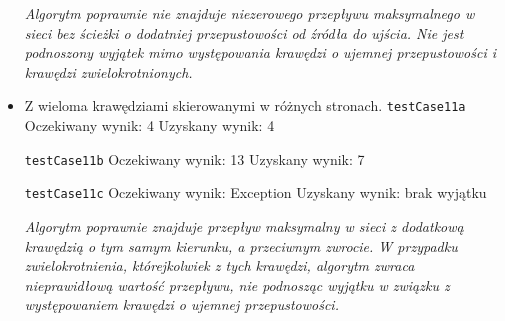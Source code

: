 \begin{itemize}[nosep]
    \emph{Algorytm poprawnie
    nie znajduje niezerowego przepływu maksymalnego w sieci bez ścieżki
    o dodatniej przepustowości od źródła do ujścia. Nie jest podnoszony
    wyjątek mimo występowania krawędzi o ujemnej przepustowości i krawędzi
    zwielokrotnionych.}

    \item Z wieloma krawędziami skierowanymi w różnych stronach.
    \texttt{testCase11a}
    Oczekiwany wynik: 4
    Uzyskany wynik: 4

    \texttt{testCase11b}
    Oczekiwany wynik: 13
    Uzyskany wynik: 7

    \texttt{testCase11c}
    Oczekiwany wynik: Exception
    Uzyskany wynik: brak wyjątku

    \emph{Algorytm poprawnie znajduje przepływ maksymalny w sieci z dodatkową krawędzią
    o tym samym kierunku, a przeciwnym zwrocie. W przypadku zwielokrotnienia,
    którejkolwiek z tych krawędzi, algorytm zwraca nieprawidłową wartość
    przepływu, nie podnosząc wyjątku w związku z występowaniem krawędzi
    o ujemnej przepustowości.}

\end{itemize}


